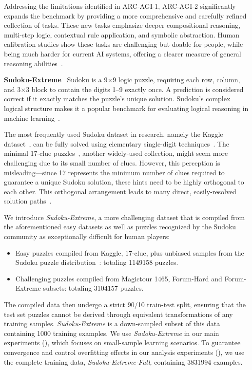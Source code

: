 Addressing the limitations identified in ARC-AGI-1, ARC-AGI-2 significantly expands the benchmark by providing a more comprehensive and carefully refined collection of tasks. These new tasks emphasize deeper compositional reasoning, multi-step logic, contextual rule application, and symbolic abstraction. Human calibration studies show these tasks are challenging but doable for people, while being much harder for current AI systems, offering a clearer measure of general reasoning abilities~\citep{Chollet2025ARCAGI2AN}.

\textbf{Sudoku-Extreme}~ Sudoku is a 9$\times$9 logic puzzle, requiring each row, column, and 3$\times$3 block to contain the digits 1–9 exactly once. A prediction is considered correct if it exactly matches the puzzle's unique solution. Sudoku's complex logical structure makes it a popular benchmark for evaluating logical reasoning in machine learning~\citep{Palm2017RecurrentRN,Long2023LargeLM,Du2024LearningIR}.

The most frequently used Sudoku dataset in research, namely the Kaggle dataset~\citep{sudoku2018}, can be fully solved using elementary single-digit techniques~\citep{SDT-Sudoku}. The minimal 17-clue puzzles~\citep{Palm2017RecurrentRN}, another widely-used collection, might seem more challenging due to its small number of clues. However, this perception is misleading---since 17 represents the minimum number of clues required to guarantee a unique Sudoku solution, these hints need to be highly orthogonal to each other. This orthogonal arrangement leads to many direct, easily-resolved solution paths~\cite{tdoku}.

We introduce \textit{Sudoku-Extreme}, a more challenging dataset that is compiled from the aforementioned easy datasets as well as puzzles recognized by the Sudoku community as exceptionally difficult for human players:
\begin{itemize}
    \item Easy puzzles compiled from Kaggle, 17-clue, plus unbiased samples from the Sudoku puzzle distribution~\cite{tdoku}: totaling \num{1149158} puzzles.
    \item Challenging puzzles compiled from Magictour 1465, Forum-Hard and Forum-Extreme subsets: totaling \num{3104157} puzzles.
\end{itemize}
The compiled data then undergo a strict 90/10 train-test split, ensuring that the test set puzzles cannot be derived through equivalent transformations of any training samples. \textit{Sudoku-Extreme} is a down-sampled subset of this data containing 1000 training examples. We use \textit{Sudoku-Extreme}  in our main experiments (), which focuses on small-sample learning scenarios. To guarantee convergence and control overfitting effects in our analysis experiments (), we use the complete training data, \textit{Sudoku-Extreme-Full}, containing \num{3831994} examples.

